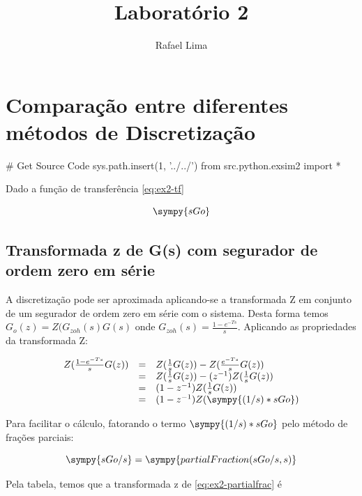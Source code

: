 \documentclass[a4paper,11pt]{article}
\title{Laboratório 2} %
\author{Rafael Lima}
\begin{document}

\section{Comparação entre diferentes métodos de Discretização}

\begin{sympycode}
# Get Source Code
sys.path.insert(1, '../../')
from src.python.exsim2 import *
\end{sympycode}

Dado a função de transferência \ref{eq:ex2-tf}

\begin{equation}\label{eq:ex2-tf}
\sympy{sGo}
\end{equation}

\subsection{Transformada z de G(s) com segurador de ordem zero em série}

A discretização pode ser aproximada aplicando-se a transformada Z em conjunto de um segurador de ordem zero em série com o sistema. Desta forma temos $G_o(z) = Z(G_{zoh}(s)G(s)$ onde $G_{zoh}(s) = \frac{1-e^{-Ts}}{s}$. Aplicando as propriedades da transformada Z:

$$
\begin{array}{lcl}
    Z(\frac{1-e^{-Ts}}{s}G(z)) &=& Z(\frac{1}{s}G(z)) - Z(\frac{e^{-Ts}}{s}G(z))\\
    &=& Z(\frac{1}{s}G(z)) - (z^{-1})Z(\frac{1}{s}G(z))\\
    &=& (1 - z^{-1})Z(\frac{1}{s}G(z))\\
    &=& (1 - z^{-1})Z(\sympy{(1/s)*sGo})\\
\end{array}
$$

Para facilitar o cálculo, fatorando o termo $\sympy{(1/s)*sGo}$ pelo método de frações parciais:

\begin{equation}\label{eq:ex2-partialfrac}
    \sympy{sGo/s} = \sympy{partialFraction(sGo/s,s)}
\end{equation}

Pela tabela, temos que a transformada z de \ref{eq:ex2-partialfrac} é
\end{document}
